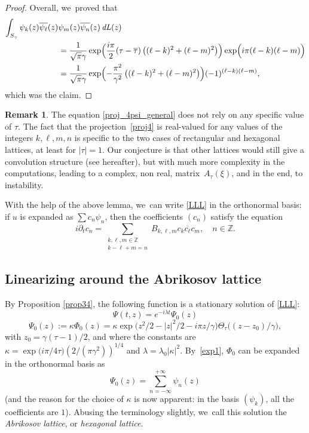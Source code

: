 \documentclass[JEP,XML,SOM,Unicode,NoFloatCountersInSection,published]{cedram}
\DeclareMathOperator{\dL}{\mathit{dL}}
\theoremstyle{definition}
\newtheorem{remark}[theorem]{Remark}
\let\EE\exp
\let\ov\overline
\newcommand\Z{\mathbb Z}
\newcommand{\pa}[1]{\left(#1\right)}
\begin{document}
\begin{proof}
Overall, we~proved that
\begin{align*}
\int_{S_{\gamma}} \psi_{k}(z)\ov{\psi_{\ell}}(z) &\psi_{m}(z)\ov{\psi_{n}}(z)\dL(z)\\
&= \frac{1}{\sqrt{\pi}\gamma} \EE\Bigl({ \frac{i\pi}{2}(\tau-\ov{\tau})\pa{(\ell-k)^2 + (\ell-m)^2}} \Bigr) \EE \Bigl({i\pi(\ell-k)(\ell-m)}\Bigr) \\
& = \frac{1}{\sqrt{\pi}\gamma} \EE\Bigl(-\frac{\pi^2}{\gamma^2}\pa{(\ell-k)^2 + (\ell-m)^2} \Bigr) (-1)^{(\ell-k)(\ell-m)},
\end{align*}
which was the claim.
\end{proof}

\begin{remark}\label{rk_tau_general}
The equation \eqref{proj_4psi_general} does not rely on any specific value of $\tau$. The fact that the projection~\eqref{proj4} is real-valued for any values of the integers $k, \ell, m,n$ is specific to the two cases of rectangular and hexagonal lattices, at least for $|\tau| = 1$. Our conjecture is that other lattices would still give a convolution structure (see hereafter), but with much more complexity in the computations, leading to a complex, non real, matrix~$A_\tau(\xi)$, and in the end, to instability.
\end{remark}

With the help of the above lemma, we~can write \eqref{LLL} in the orthonormal basis: if $u$ is expanded as $\sum c_n \psi_n$, then the coefficients $(c_n)$ satisfy the equation
\begin{equation}
\label{eqinck}
i \partial_t c_n = \sum_{\substack{k,\ell,m \in \mathbb{Z} \\ k - \ell + m = n}} B_{k,\ell,m} c_{k} \ov{c_{\ell}} c_{m}, \quad n \in \Z.
\end{equation}

\subsection{Linearizing around the Abrikosov lattice}

By Proposition \ref{prop34}, the following function is a stationary solution of \eqref{LLL}:
\begin{equation*}
\Psi(t,z) = e^{-i\lambda t}\Psi_0(z)
\end{equation*}
\begin{equation}\label{def1.1}
\Psi_0(z):= \kappa \Phi_0(z)= \kappa \EE\bigl({z^2/2-|z|^2/2-{i\pi z}/{\gamma}} \bigr)\Theta_\tau\bigl({ \pa{z-z_0}/\gamma}\bigr),
\end{equation}
with $z_0 = {\gamma}(\tau-1)/2$, and where the constants are $\kappa= \EE\bigl({i{\pi}/{4}\tau}\bigr) \pa{{2}/({\pi\gamma^2})}^{1/4}$ and $\lambda = \lambda_0 |\kappa|^2$. By~\eqref{exp1}, $\Phi_0$ can be expanded in the orthonormal basis as
\[
\Psi_0(z) = \sum_{n=-\infty}^{+\infty} \psi_n(z)
\]
(and the reason for the choice of $\kappa$ is now apparent: in the basis $(\psi_k)$, all the coefficients are $1$). Abusing the terminology slightly, we~call this solution the \emph{Abrikosov lattice}, or \emph{hexagonal lattice}.
\end{document}

